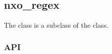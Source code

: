 %
%
%
%
%              

\subsection{nxo\_regex}
\label{nxo_regex}

The  class is a subclass of the  class.

\subsubsection{API}
